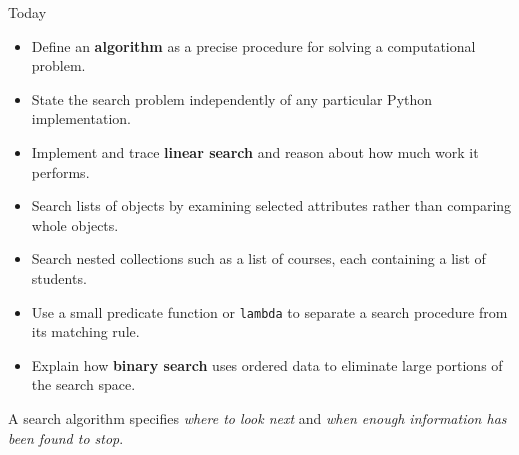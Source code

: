 \documentclass[aspectratio=169,10pt]{beamer}
\begin{document}
\makedecktitle

\begin{frame}{Today}
  \begin{itemize}
    \item Define an \textbf{algorithm} as a precise procedure for solving a computational problem.
    \item State the search problem independently of any particular Python implementation.
    \item Implement and trace \textbf{linear search} and reason about how much work it performs.
    \item Search lists of objects by examining selected attributes rather than comparing whole objects.
    \item Search nested collections such as a list of courses, each containing a list of students.
    \item Use a small predicate function or \texttt{lambda} to separate a search procedure from its matching rule.
    \item Explain how \textbf{binary search} uses ordered data to eliminate large portions of the search space.
  \end{itemize}

  \begin{keyidea}
    A search algorithm specifies \emph{where to look next} and \emph{when enough information has been found to stop}.
  \end{keyidea}
\end{frame}
\end{document}
